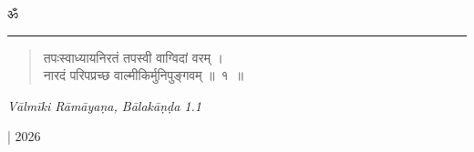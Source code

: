 \begin{center}
{\la\Huge ॐ}\\[4pt]
\rule{.1\linewidth}{2pt}
\end{center}

\begin{quote}
\vp
तपःस्वाध्यायनिरतं तपस्वी वाग्विदां वरम् ।\\
नारदं परिपप्रच्छ वाल्मीकिर्मुनिपुङ्गवम् ॥~१~॥
\end{quote}

\begin{flushright}
\en\textit{Vālmīki Rāmāyaṇa, Bālakāṇḍa 1.1}
\end{flushright}

\hfill | 2026
\newpage
